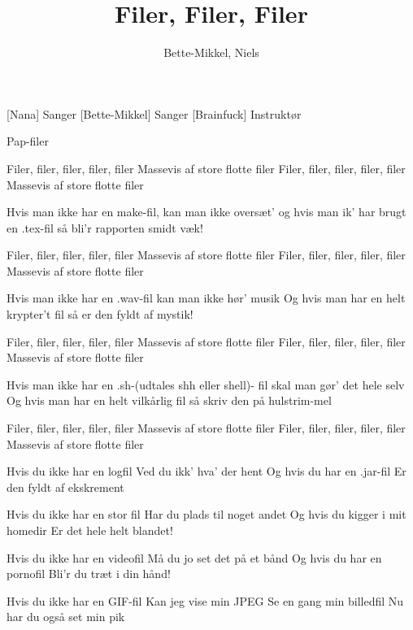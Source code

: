 \documentclass[a4paper,11pt]{article}
\title{Filer, Filer, Filer}
\author{Bette-Mikkel, Niels}
\begin{document}
\maketitle

\begin{roles}
[Nana] Sanger
[Bette-Mikkel] Sanger
[Brainfuck] Instruktør
\end{roles}

\begin{props}
    \prop Pap-filer
\end{props}

\begin{sketch}

\end{sketch}

\begin{song}

%
Filer, filer,
filer, filer, filer
Massevis af store flotte filer
Filer, filer,
filer, filer, filer
Massevis af store flotte filer

Hvis man ikke har en make-fil,
kan man ikke oversæt'
og hvis man ik' har brugt en .tex-fil
så bli'r rapporten smidt væk!

Filer, filer,
filer, filer, filer
Massevis af store flotte filer
Filer, filer,
filer, filer, filer
Massevis af store flotte filer

Hvis man ikke har en .wav-fil
kan man ikke hør' musik
Og hvis man har en helt krypter't fil
så er den fyldt af mystik!

Filer, filer,
filer, filer, filer
Massevis af store flotte filer
Filer, filer,
filer, filer, filer
Massevis af store flotte filer

Hvis man ikke har en .sh-(udtales shh eller shell)- fil
skal man gør' det hele selv
Og hvis man har en helt vilkårlig fil
så skriv den på hulstrim-mel


Filer, filer,
filer, filer, filer
Massevis af store flotte filer
Filer, filer,
filer, filer, filer
Massevis af store flotte filer


Hvis du ikke har en logfil
Ved du ikk' hva' der hent
Og hvis du har en .jar-fil
Er den fyldt af ekskrement


Hvis du ikke har en stor fil
Har du plads til noget andet
Og hvis du kigger i mit homedir
Er det hele helt blandet!


Hvis du ikke har en videofil
Må du jo set det på et bånd
Og hvis du har en pornofil
Bli'r du træt i din hånd!


Hvis du ikke har en GIF-fil
Kan jeg vise min JPEG
Se en gang min billedfil
Nu har du også set min pik

\end{song}
\end{document}
